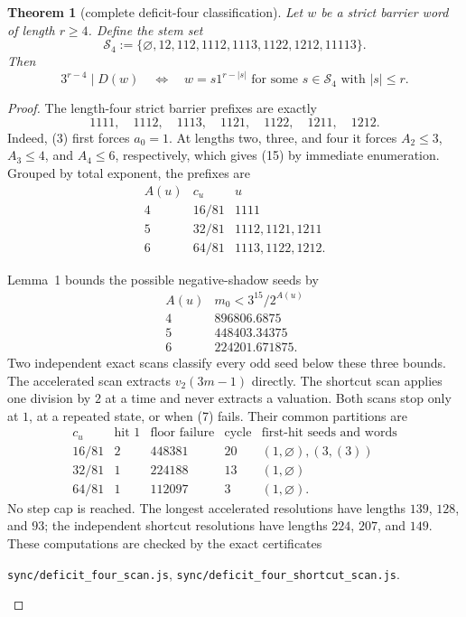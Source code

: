 \documentclass[11pt]{article}
\newtheorem{theorem}{Theorem}
\begin{document}
\begin{theorem}[complete deficit-four classification]
Let $w$ be a strict barrier word of length $r\geq4$.  Define the stem set
\[
  \mathcal S_4:=
  \{\varnothing,12,112,1112,1113,1122,1212,11113\}.
  \tag{13}
\]
Then
\[
\boxed{
  3^{r-4}\mid D(w)
  \quad\Longleftrightarrow\quad
  w=s1^{r-|s|}
  \text{ for some }s\in\mathcal S_4\text{ with }|s|\leq r.}
\tag{14}
\]
\end{theorem}

\begin{proof}
The length-four strict barrier prefixes are exactly
\[
  1111,\quad1112,\quad1113,\quad1121,\quad1122,\quad1211,\quad1212.
  \tag{15}
\]
Indeed, (3) first forces $a_0=1$.  At lengths two, three, and four it forces
$A_2\leq3$, $A_3\leq4$, and $A_4\leq6$, respectively, which gives (15) by
immediate enumeration.  Grouped by total exponent, the prefixes are
\[
\begin{array}{c|c|c}
 A(u)&c_u&u\\ \hline
 4&16/81&1111\\
 5&32/81&1112,1121,1211\\
 6&64/81&1113,1122,1212.
\end{array}
\tag{16}
\]

Lemma~1 bounds the possible negative-shadow seeds by
\[
\begin{array}{c|c}
 A(u)&m_0<3^{15}/2^{A(u)}\\ \hline
 4&896806.6875\\
 5&448403.34375\\
 6&224201.671875.
\end{array}
\tag{17}
\]
Two independent exact scans classify every odd seed below these three
bounds.  The accelerated scan extracts $v_2(3m-1)$ directly.  The shortcut
scan applies one division by $2$ at a time and never extracts a valuation.
Both scans stop only at $1$, at a repeated state, or when (7) fails.  Their
common partitions are
\[
\begin{array}{c|r|r|r|c}
 c_u&\text{hit }1&\text{floor failure}&\text{cycle}&
 \text{first-hit seeds and words}\\ \hline
 16/81&2&448381&20&(1,\varnothing),(3,(3))\\
 32/81&1&224188&13&(1,\varnothing)\\
 64/81&1&112097&3&(1,\varnothing).
\end{array}
\tag{18}
\]
No step cap is reached.  The longest accelerated resolutions have lengths
$139$, $128$, and $93$; the independent shortcut resolutions have lengths
$224$, $207$, and $149$.  These computations are checked by the exact
certificates
\begin{center}
\texttt{sync/deficit\_four\_scan.js},\qquad
\texttt{sync/deficit\_four\_shortcut\_scan.js}.
\end{center}


\end{proof}
\end{document}
